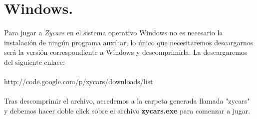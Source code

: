 \section{Windows.}

\paragraph{}
Para jugar a \emph{Zycars} en el sistema operativo Windows no es necesario la instalación de ningún programa
auxiliar, lo único que necesitaremos descargarnos será la versión correspondiente
a Windows y descomprimirla. La descargaremos
del siguiente enlace:\\\\

http://code.google.com/p/zycars/downloads/list

\paragraph{}
Tras descomprimir el archivo, accedemos a la carpeta generada llamada "zycars" y debemos hacer doble click 
sobre el archivo \textbf{zycars.exe} para comenzar a jugar.
